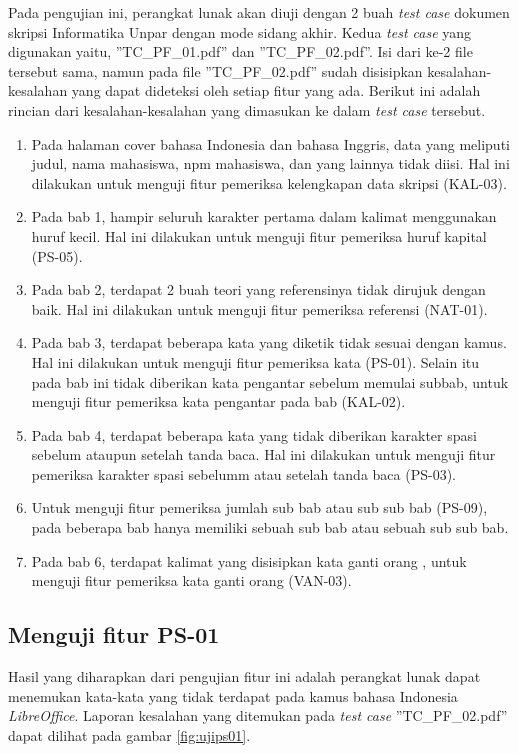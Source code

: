 Pada pengujian ini, perangkat lunak akan diuji dengan 2 buah \textit{test case} dokumen skripsi Informatika Unpar dengan mode sidang akhir. Kedua \textit{test case} yang digunakan yaitu, ''TC\_PF\_01.pdf'' dan ''TC\_PF\_02.pdf''. Isi dari ke-2 file tersebut sama, namun pada file ''TC\_PF\_02.pdf'' sudah disisipkan kesalahan-kesalahan yang dapat dideteksi oleh setiap fitur yang ada. Berikut ini adalah rincian dari kesalahan-kesalahan yang dimasukan ke dalam \textit{test case} tersebut.

\begin{enumerate}
	\item Pada halaman cover bahasa Indonesia dan bahasa Inggris, data yang meliputi judul, nama mahasiswa, npm mahasiswa, dan yang lainnya tidak diisi. Hal ini dilakukan untuk menguji fitur pemeriksa kelengkapan data skripsi (KAL-03).
	
	\item Pada bab 1, hampir seluruh karakter pertama dalam kalimat menggunakan huruf kecil. Hal ini dilakukan untuk menguji fitur pemeriksa huruf kapital (PS-05).
	
	\item Pada bab 2, terdapat 2 buah teori yang referensinya tidak dirujuk dengan baik. Hal ini dilakukan untuk menguji fitur pemeriksa referensi (NAT-01).
	
	\item Pada bab 3, terdapat beberapa kata yang diketik tidak sesuai dengan kamus. Hal ini dilakukan untuk menguji fitur pemeriksa kata (PS-01). Selain itu pada bab ini tidak diberikan kata pengantar sebelum memulai subbab, untuk menguji fitur pemeriksa kata pengantar pada bab (KAL-02).
	
	\item Pada bab 4, terdapat beberapa kata yang tidak diberikan karakter spasi sebelum ataupun setelah tanda baca. Hal ini dilakukan untuk menguji fitur pemeriksa karakter spasi sebelumm atau setelah tanda baca (PS-03).	

	\item Untuk menguji fitur pemeriksa jumlah sub bab atau sub sub bab (PS-09), pada beberapa bab hanya memiliki sebuah sub bab atau sebuah sub sub bab.
		
	\item Pada bab 6, terdapat kalimat yang disisipkan kata ganti orang , untuk menguji fitur pemeriksa kata ganti orang (VAN-03).
\end{enumerate}

\subsection{Menguji fitur PS-01}
Hasil yang diharapkan dari pengujian fitur ini adalah perangkat lunak dapat menemukan kata-kata yang tidak terdapat pada kamus bahasa Indonesia \textit{LibreOffice}. Laporan kesalahan yang ditemukan pada \textit{test case} ''TC\_PF\_02.pdf'' dapat dilihat pada gambar \ref{fig:ujips01}.

